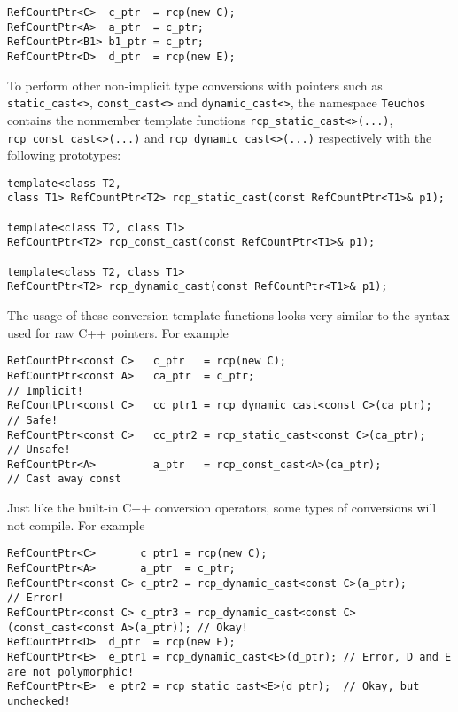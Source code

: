 {\scriptsize\begin{verbatim}
RefCountPtr<C>  c_ptr  = rcp(new C);
RefCountPtr<A>  a_ptr  = c_ptr;
RefCountPtr<B1> b1_ptr = c_ptr;
RefCountPtr<D>  d_ptr  = rcp(new E);
\end{verbatim}}

To perform other non-implicit type conversions with pointers such as
{}\texttt{static\-\_cast<>}, {}\texttt{const\-\_cast<>} and
{}\texttt{dynamic\-\_cast<>}, the namespace {}\texttt{Teuchos}
contains the nonmember template functions
{}\texttt{rcp\-\_static\-\_cast<>(...)},
{}\texttt{rcp\-\_const\-\_cast<>(...)} and
{}\texttt{rcp\-\_dynamic\-\_cast<>(...)} respectively with the
following prototypes:

{\scriptsize\begin{verbatim}
template<class T2,
class T1> RefCountPtr<T2> rcp_static_cast(const RefCountPtr<T1>& p1);

template<class T2, class T1>
RefCountPtr<T2> rcp_const_cast(const RefCountPtr<T1>& p1);

template<class T2, class T1>
RefCountPtr<T2> rcp_dynamic_cast(const RefCountPtr<T1>& p1);
\end{verbatim}}

The usage of these conversion template functions looks very similar to
the syntax used for raw C++ pointers.  For example

{\scriptsize\begin{verbatim}
RefCountPtr<const C>   c_ptr   = rcp(new C);
RefCountPtr<const A>   ca_ptr  = c_ptr;                              // Implicit!
RefCountPtr<const C>   cc_ptr1 = rcp_dynamic_cast<const C>(ca_ptr);  // Safe!
RefCountPtr<const C>   cc_ptr2 = rcp_static_cast<const C>(ca_ptr);   // Unsafe!
RefCountPtr<A>         a_ptr   = rcp_const_cast<A>(ca_ptr);          // Cast away const
\end{verbatim}}

Just like the built-in C++ conversion operators, some types of
conversions will not compile.  For example

{\scriptsize\begin{verbatim}
RefCountPtr<C>       c_ptr1 = rcp(new C);
RefCountPtr<A>       a_ptr  = c_ptr;
RefCountPtr<const C> c_ptr2 = rcp_dynamic_cast<const C>(a_ptr);                      // Error!
RefCountPtr<const C> c_ptr3 = rcp_dynamic_cast<const C>(const_cast<const A>(a_ptr)); // Okay!
RefCountPtr<D>  d_ptr  = rcp(new E);
RefCountPtr<E>  e_ptr1 = rcp_dynamic_cast<E>(d_ptr); // Error, D and E are not polymorphic!
RefCountPtr<E>  e_ptr2 = rcp_static_cast<E>(d_ptr);  // Okay, but unchecked!
\end{verbatim}}

